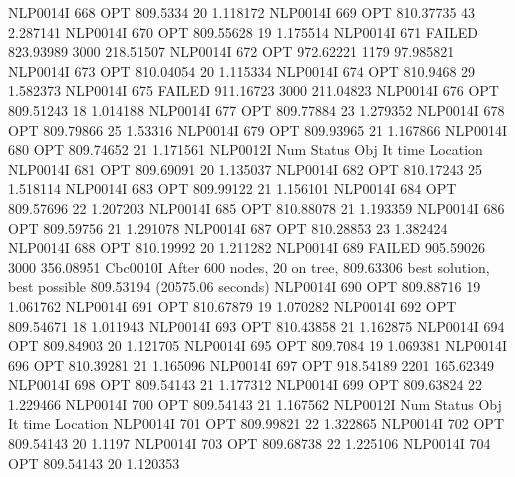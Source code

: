 NLP0014I           668         OPT 809.5334       20 1.118172
NLP0014I           669         OPT 810.37735       43 2.287141
NLP0014I           670         OPT 809.55628       19 1.175514
NLP0014I           671      FAILED 823.93989     3000 218.51507
NLP0014I           672         OPT 972.62221     1179 97.985821
NLP0014I           673         OPT 810.04054       20 1.115334
NLP0014I           674         OPT 810.9468       29 1.582373
NLP0014I           675      FAILED 911.16723     3000 211.04823
NLP0014I           676         OPT 809.51243       18 1.014188
NLP0014I           677         OPT 809.77884       23 1.279352
NLP0014I           678         OPT 809.79866       25 1.53316
NLP0014I           679         OPT 809.93965       21 1.167866
NLP0014I           680         OPT 809.74652       21 1.171561
NLP0012I 
              Num      Status      Obj             It       time                 Location
NLP0014I           681         OPT 809.69091       20 1.135037
NLP0014I           682         OPT 810.17243       25 1.518114
NLP0014I           683         OPT 809.99122       21 1.156101
NLP0014I           684         OPT 809.57696       22 1.207203
NLP0014I           685         OPT 810.88078       21 1.193359
NLP0014I           686         OPT 809.59756       21 1.291078
NLP0014I           687         OPT 810.28853       23 1.382424
NLP0014I           688         OPT 810.19992       20 1.211282
NLP0014I           689      FAILED 905.59026     3000 356.08951
Cbc0010I After 600 nodes, 20 on tree, 809.63306 best solution, best possible 809.53194 (20575.06 seconds)
NLP0014I           690         OPT 809.88716       19 1.061762
NLP0014I           691         OPT 810.67879       19 1.070282
NLP0014I           692         OPT 809.54671       18 1.011943
NLP0014I           693         OPT 810.43858       21 1.162875
NLP0014I           694         OPT 809.84903       20 1.121705
NLP0014I           695         OPT 809.7084       19 1.069381
NLP0014I           696         OPT 810.39281       21 1.165096
NLP0014I           697         OPT 918.54189     2201 165.62349
NLP0014I           698         OPT 809.54143       21 1.177312
NLP0014I           699         OPT 809.63824       22 1.229466
NLP0014I           700         OPT 809.54143       21 1.167562
NLP0012I 
              Num      Status      Obj             It       time                 Location
NLP0014I           701         OPT 809.99821       22 1.322865
NLP0014I           702         OPT 809.54143       20 1.1197
NLP0014I           703         OPT 809.68738       22 1.225106
NLP0014I           704         OPT 809.54143       20 1.120353
